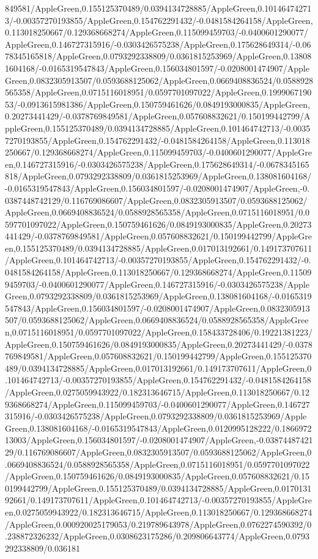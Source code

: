 {\begin{tikzternal}
{849581/AppleGreen,0.155125370489/0.0394134728885/AppleGreen,0.101464742713/-0.00357270193855/AppleGreen,0.154762291432/-0.0481584264158/AppleGreen,0.113018250667/0.129368668274/AppleGreen,0.115099459703/-0.0400601290077/AppleGreen,0.146727315916/-0.0303426575238/AppleGreen,0.175628649314/-0.0678345165818/AppleGreen,0.0793292338809/0.0361815253969/AppleGreen,0.138081604168/-0.0165319547843/AppleGreen,0.156034801597/-0.0208001474907/AppleGreen,0.0832305913507/0.0593688125062/AppleGreen,0.0669408836524/0.0588928565358/AppleGreen,0.0715116018951/0.0597701097022/AppleGreen,0.199906719053/-0.0913615981386/AppleGreen,0.150759461626/0.0849193000835/AppleGreen,0.20273441429/-0.0378769849581/AppleGreen,0.057608832621/0.150199442799/AppleGreen,0.155125370489/0.0394134728885/AppleGreen,0.101464742713/-0.00357270193855/AppleGreen,0.154762291432/-0.0481584264158/AppleGreen,0.113018250667/0.129368668274/AppleGreen,0.115099459703/-0.0400601290077/AppleGreen,0.146727315916/-0.0303426575238/AppleGreen,0.175628649314/-0.0678345165818/AppleGreen,0.0793292338809/0.0361815253969/AppleGreen,0.138081604168/-0.0165319547843/AppleGreen,0.156034801597/-0.0208001474907/AppleGreen,-0.0387448742129/0.116769086607/AppleGreen,0.0832305913507/0.0593688125062/AppleGreen,0.0669408836524/0.0588928565358/AppleGreen,0.0715116018951/0.0597701097022/AppleGreen,0.150759461626/0.0849193000835/AppleGreen,0.20273441429/-0.0378769849581/AppleGreen,0.057608832621/0.150199442799/AppleGreen,0.155125370489/0.0394134728885/AppleGreen,0.017013192661/0.149173707611/AppleGreen,0.101464742713/-0.00357270193855/AppleGreen,0.154762291432/-0.0481584264158/AppleGreen,0.113018250667/0.129368668274/AppleGreen,0.115099459703/-0.0400601290077/AppleGreen,0.146727315916/-0.0303426575238/AppleGreen,0.0793292338809/0.0361815253969/AppleGreen,0.138081604168/-0.0165319547843/AppleGreen,0.156034801597/-0.0208001474907/AppleGreen,0.0832305913507/0.0593688125062/AppleGreen,0.0669408836524/0.0588928565358/AppleGreen,0.0715116018951/0.0597701097022/AppleGreen,0.158433728406/0.19221381223/AppleGreen,0.150759461626/0.0849193000835/AppleGreen,0.20273441429/-0.0378769849581/AppleGreen,0.057608832621/0.150199442799/AppleGreen,0.155125370489/0.0394134728885/AppleGreen,0.017013192661/0.149173707611/AppleGreen,0.101464742713/-0.00357270193855/AppleGreen,0.154762291432/-0.0481584264158/AppleGreen,0.0275059943922/0.182313646715/AppleGreen,0.113018250667/0.129368668274/AppleGreen,0.115099459703/-0.0400601290077/AppleGreen,0.146727315916/-0.0303426575238/AppleGreen,0.0793292338809/0.0361815253969/AppleGreen,0.138081604168/-0.0165319547843/AppleGreen,0.0120995128222/0.186697213003/AppleGreen,0.156034801597/-0.0208001474907/AppleGreen,-0.0387448742129/0.116769086607/AppleGreen,0.0832305913507/0.0593688125062/AppleGreen,0.0669408836524/0.0588928565358/AppleGreen,0.0715116018951/0.0597701097022/AppleGreen,0.150759461626/0.0849193000835/AppleGreen,0.057608832621/0.150199442799/AppleGreen,0.155125370489/0.0394134728885/AppleGreen,0.017013192661/0.149173707611/AppleGreen,0.101464742713/-0.00357270193855/AppleGreen,0.0275059943922/0.182313646715/AppleGreen,0.113018250667/0.129368668274/AppleGreen,0.000920025179053/0.219789643978/AppleGreen,0.0762274590392/0.238872326232/AppleGreen,0.0308623175286/0.209806643774/AppleGreen,0.0793292338809/0.036181}
\end{tikzternal}}
